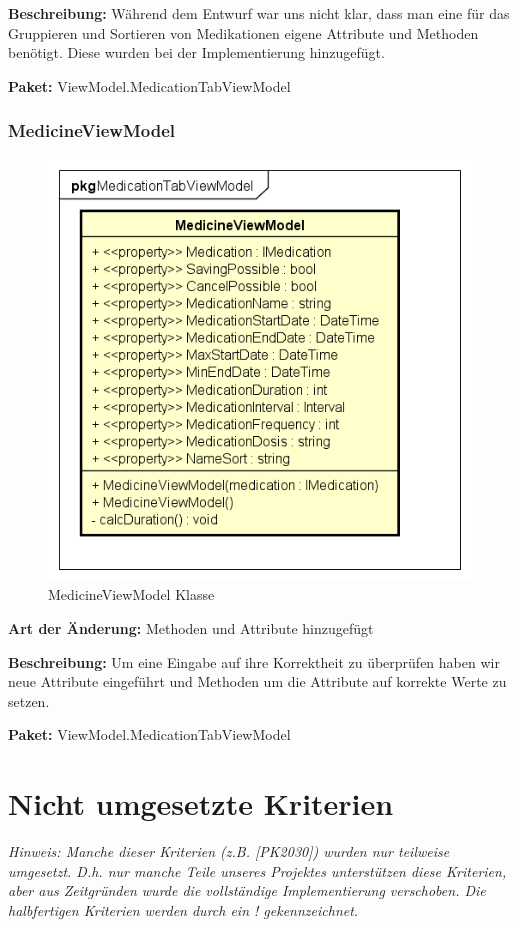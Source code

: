 \documentclass[a4paper]{scrreprt}
\begin{document}
\textbf{Beschreibung:}  Während dem Entwurf war uns nicht klar, dass man eine für das Gruppieren und Sortieren von Medikationen eigene Attribute und Methoden benötigt. Diese wurden bei der Implementierung hinzugefügt.

\textbf{Paket:} ViewModel.MedicationTabViewModel

\subsubsection{MedicineViewModel}
\begin{figure}[H]
\centering
\includegraphics[width=0.45\textheight]{graphics/Klassendiagramme/ViewModel/MedicineViewModel}
\caption{MedicineViewModel Klasse}
\end{figure}
\textbf{Art der Änderung:} Methoden und Attribute hinzugefügt

\textbf{Beschreibung:}  Um eine Eingabe auf ihre Korrektheit zu überprüfen haben wir neue Attribute eingeführt und Methoden um die Attribute auf korrekte Werte zu setzen.

\textbf{Paket:} ViewModel.MedicationTabViewModel

\section{Nicht umgesetzte Kriterien}
\textit{Hinweis: Manche dieser Kriterien (z.B. [PK2030]) wurden nur teilweise umgesetzt. D.h. nur manche Teile unseres Projektes unterstützen diese Kriterien, aber aus Zeitgründen wurde die vollständige Implementierung verschoben. Die halbfertigen Kriterien werden durch ein \dq{}!\dq{} gekennzeichnet.}
\end{document}
